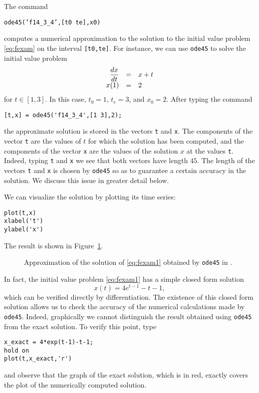 \documentclass{ximera}
\begin{document}
The \Matlab command 
\begin{center}
{\tt ode45('f14\_3\_4',[t0 te],x0)}
\end{center} 
computes a numerical approximation to the solution to the initial value 
problem \eqref{eq:fexam} on the interval {\tt [t0,te]}.
For instance, we can use {\tt ode45} to solve the initial value problem
\begin{equation}  \label{eq:fexam1}
\begin{array}{rcl}
\displaystyle \frac{dx}{dt} & = & x+t \\
x(1) & = & 2
\end{array}
\end{equation}
for $t\in[1,3]$. In this case, $t_0=1$, $t_e=3$, and $x_0=2$.  After 
typing the command
\begin{verbatim}
[t,x] = ode45('f14_3_4',[1 3],2);
\end{verbatim}
the approximate solution is stored in the vectors {\tt t} and {\tt x}.
The components of the vector {\tt t} are the values of $t$ for which the 
solution has been computed, and the components of the vector {\tt x} are 
the values of the solution $x$ at the values {\tt t}.  Indeed, typing 
{\tt t} and {\tt x} we see that both vectors have length $45$.   The
length of the vectors {\tt t} and {\tt x} is chosen by {\tt ode45} so
as to guarantee a certain accuracy in the solution.  We discuss this 
issue in greater detail below.

We can visualize the solution by plotting its time series:
\begin{verbatim}
plot(t,x)
xlabel('t')
ylabel('x')
\end{verbatim}
The result is shown in Figure~\ref{fig:ode45ex1}.  

\begin{figure}[htb]
   \centerline{%
   }
   \caption{Approximation of the solution of
   \protect\eqref{eq:fexam1} obtained by {\tt ode45} in \protect\Matlabp.}
   \label{fig:ode45ex1}
\end{figure}

In fact, the initial value problem \eqref{eq:fexam1} has a simple closed form 
solution
\[
x(t) = 4e^{t-1}-t-1,
\]
which can be verified directly by differentiation.  The existence of this
closed form solution allows us to check the accuracy of the numerical
calculations made by {\tt ode45}.  Indeed, graphically we cannot distinguish 
the result obtained using {\tt ode45} from the exact 
solution.  To verify this point, type
\begin{verbatim}
x_exact = 4*exp(t-1)-t-1;
hold on
plot(t,x_exact,'r')
\end{verbatim}
and observe that the graph of the exact solution, which is in red, exactly
covers the plot of the numerically computed solution.
\end{document}
